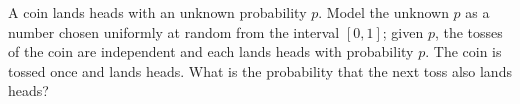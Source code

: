 A coin lands heads with an unknown probability $p$. Model the unknown $p$ as a number chosen uniformly at random from the interval $[0,1]$; given $p$, the tosses of the coin are independent and each lands heads with probability $p$. The coin is tossed once and lands heads. What is the probability that the next toss also lands heads?
